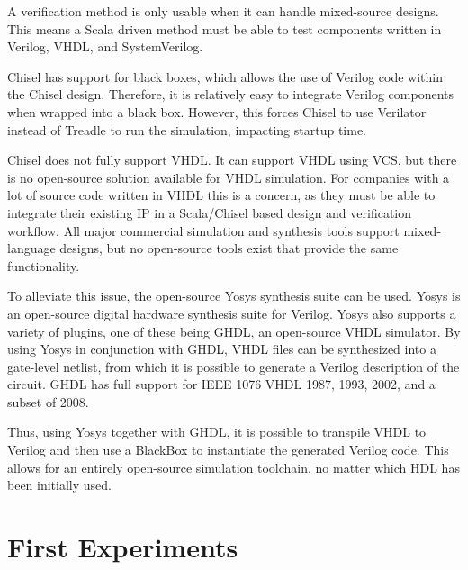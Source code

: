 \documentclass[conference]{IEEEtran}
\newcommand{\martin}[1]{{\color{blue} Martin: #1}}
\newcommand{\simon}[1]{{\color{green} Simon: #1}}
\newcommand{\kasper}[1]{{\color{purple} Kasper: #1}}
\renewcommand{\martin}[1]{}
\renewcommand{\simon}[1]{}
\renewcommand{\kasper}[1]{}
\begin{document}
A verification method is only usable when it can handle mixed-source designs.
This means a Scala driven method must be able to test components written in Verilog,
VHDL, and SystemVerilog.

Chisel has support for black boxes, which allows the use of Verilog code within the Chisel design.
Therefore, it is relatively easy to integrate Verilog components when wrapped into a black box.
However, this forces Chisel to use Verilator instead of Treadle to run the simulation, impacting
startup time.

Chisel does not fully support VHDL. It can support VHDL using VCS, but there is no
open-source solution available for VHDL simulation. For companies with a lot of source code written in VHDL this is a concern, as they must be able to integrate their existing IP in a Scala/Chisel based design and verification workflow.
All major commercial simulation and synthesis tools support mixed-language designs, but no open-source tools exist that provide the same functionality.

\simon{Refs for Yosys and GHDL are missing}

\martin{Simon, the latest version does not really use a gate list, but something other. Can you elaborate?}
\kasper{From what you showed on Tuesday, it seems that Yosys/GHDL doesn't use the gate-level implementation, but works at the RTL level}

To alleviate this issue, the open-source Yosys synthesis suite can be used. Yosys is an open-source digital hardware synthesis suite for Verilog. Yosys also supports a variety of plugins, one of these being GHDL, an open-source VHDL simulator. By using Yosys in conjunction with GHDL, VHDL files can be synthesized into a gate-level netlist, from which it is possible to generate a Verilog description of the circuit. GHDL has full support for IEEE 1076 VHDL 1987, 1993, 2002, and a subset of 2008.  

Thus, using Yosys together with GHDL, it is possible to transpile VHDL to Verilog and then use a BlackBox to instantiate the generated Verilog code. This allows for an entirely open-source simulation toolchain, no matter which HDL has been initially used.

\simon{Insert small image that depicts the workflow for this.}

\section{First Experiments}
\label{sec:eval}
\end{document}
